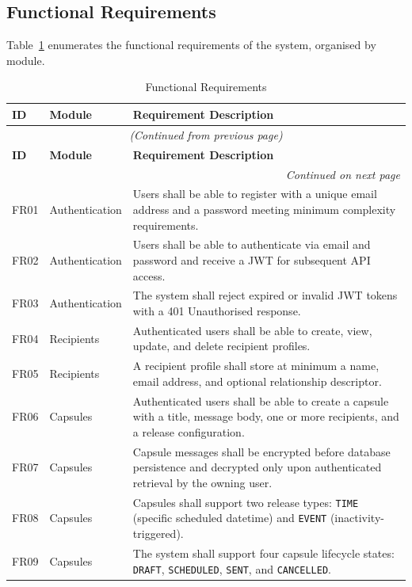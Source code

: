 \documentclass[12pt, a4paper]{article}
\begin{document}
\subsection{Functional Requirements}

Table~\ref{tab:functional_req} enumerates the functional requirements of the system, organised by module.

\begin{longtable}{|p{0.8cm}|p{3.5cm}|p{8.5cm}|}
\caption{Functional Requirements}
\label{tab:functional_req}\\
\hline
\textbf{ID} & \textbf{Module} & \textbf{Requirement Description} \\
\hline
\endfirsthead
\multicolumn{3}{c}{\textit{(Continued from previous page)}}\\
\hline
\textbf{ID} & \textbf{Module} & \textbf{Requirement Description} \\
\hline
\endhead
\hline
\multicolumn{3}{r}{\textit{Continued on next page}}\\
\endfoot
\hline
\endlastfoot
FR01 & Authentication & Users shall be able to register with a unique email address and a password meeting minimum complexity requirements. \\
\hline
FR02 & Authentication & Users shall be able to authenticate via email and password and receive a JWT for subsequent API access. \\
\hline
FR03 & Authentication & The system shall reject expired or invalid JWT tokens with a 401 Unauthorised response. \\
\hline
FR04 & Recipients & Authenticated users shall be able to create, view, update, and delete recipient profiles. \\
\hline
FR05 & Recipients & A recipient profile shall store at minimum a name, email address, and optional relationship descriptor. \\
\hline
FR06 & Capsules & Authenticated users shall be able to create a capsule with a title, message body, one or more recipients, and a release configuration. \\
\hline
FR07 & Capsules & Capsule messages shall be encrypted before database persistence and decrypted only upon authenticated retrieval by the owning user. \\
\hline
FR08 & Capsules & Capsules shall support two release types: \texttt{TIME} (specific scheduled datetime) and \texttt{EVENT} (inactivity-triggered). \\
\hline
FR09 & Capsules & The system shall support four capsule lifecycle states: \texttt{DRAFT}, \texttt{SCHEDULED}, \texttt{SENT}, and \texttt{CANCELLED}. \\

\end{longtable}
\end{document}
